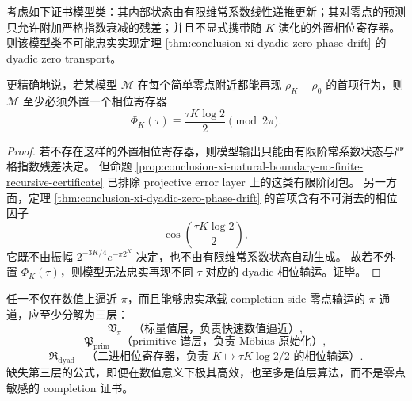 \begin{theorem}[二进相位寄存器下界]\label{thm:conclusion-xi-dyadic-phase-register-lower-bound}
考虑如下证书模型类：其内部状态由有限维常系数线性递推更新；其对零点的预测只允许附加严格指数衰减的残差；并且不显式携带随 \(K\) 演化的外置相位寄存器。
则该模型类不可能忠实实现定理 \ref{thm:conclusion-xi-dyadic-zero-phase-drift} 的 dyadic zero transport。

更精确地说，若某模型 \(\mathcal M\) 在每个简单零点附近都能再现 \(\rho_K-\rho_0\) 的首项行为，则 \(\mathcal M\) 至少必须外置一个相位寄存器
\[
\Phi_K(\tau)\equiv \frac{\tau K\log2}{2}\pmod{2\pi}.
\]
\end{theorem}
\begin{proof}
若不存在这样的外置相位寄存器，则模型输出只能由有限阶常系数状态与严格指数残差决定。
但命题 \ref{prop:conclusion-xi-natural-boundary-no-finite-recursive-certificate} 已排除 projective error layer 上的这类有限阶闭包。
另一方面，定理 \ref{thm:conclusion-xi-dyadic-zero-phase-drift} 的首项含有不可消去的相位因子
\[
\cos\!\left(\frac{\tau K\log2}{2}\right),
\]
它既不由振幅 \(2^{-3K/4}e^{-\pi2^K}\) 决定，也不由有限维常系数状态自动生成。
故若不外置 \(\Phi_K(\tau)\)，则模型无法忠实再现不同 \(\tau\) 对应的 dyadic 相位输运。证毕。
\end{proof}

\begin{conjecture}\label{conj:conclusion-xi-zero-sensitive-pi-channel-trisplitting}
任一不仅在数值上逼近 \(\pi\)，而且能够忠实承载 completion-side 零点输运的 \(\pi\)-通道，应至少分解为三层：
\[
\mathfrak V_{\pi}
\quad\text{（标量值层，负责快速数值逼近）},
\]
\[
\mathfrak P_{\mathrm{prim}}
\quad\text{（primitive 谱层，负责 M\"obius 原始化）},
\]
\[
\mathfrak R_{\mathrm{dyad}}
\quad\text{（二进相位寄存器，负责 }K\mapsto \tau K\log2/2\text{ 的相位输运）}.
\]
缺失第三层的公式，即便在数值意义下极其高效，也至多是值层算法，而不是零点敏感的 completion 证书。
\end{conjecture}
